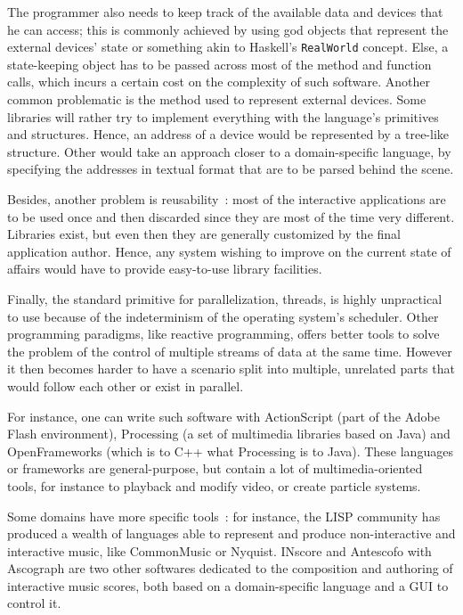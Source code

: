 \documentclass{sigchi}
\begin{document}
The programmer also needs to keep track of the available data and devices that he can access; this is commonly achieved by using god objects that represent the external devices' state or something akin to Haskell's \texttt{RealWorld} concept\cite{launchbury1995state}. Else, a state-keeping object has to be passed across most of the method and function calls, which incurs a certain cost on the complexity of such software. Another common problematic is the method used to represent external devices. Some libraries will rather try to implement everything with the language's primitives and structures. Hence, an address of a device would be represented by a tree-like structure. Other would take an approach closer to a domain-specific language, by specifying the addresses in textual format that are to be parsed behind the scene. 

Besides, another problem is reusability~: most of the interactive applications are to be used once and then discarded since they are most of the time very different. Libraries exist, but even then they are generally customized by the final application author. Hence, any system wishing to improve on the current state of affairs would have to provide easy-to-use library facilities.

Finally, the standard primitive for parallelization, threads, is highly unpractical to use because of the indeterminism of the operating system's scheduler. Other programming paradigms, like reactive programming, offers better tools to solve the problem of the control of multiple streams of data at the same time. However it then becomes harder to have a scenario split into multiple, unrelated parts that would follow each other or exist in parallel.

For instance, one can write such software with ActionScript (part of the Adobe Flash environment), Processing (a set of multimedia libraries based on Java) and OpenFrameworks (which is to C++ what Processing is to Java)\cite{noble2009programming}. These languages or frameworks are general-purpose, but contain a lot of multimedia-oriented tools, for instance to playback and modify video, or create particle systems. 

Some domains have more specific tools~: for instance, the LISP community has produced a wealth of languages able to represent and produce non-interactive and interactive music, like CommonMusic\cite{taube1997introduction} or Nyquist\cite{dannenbergnyquist}. INscore\cite{fober2013programming} and Antescofo with Ascograph\cite{coffy2014ascograph} are two other softwares dedicated to the composition and authoring of interactive music scores, both based on a domain-specific language and a GUI to control it.
\end{document}
